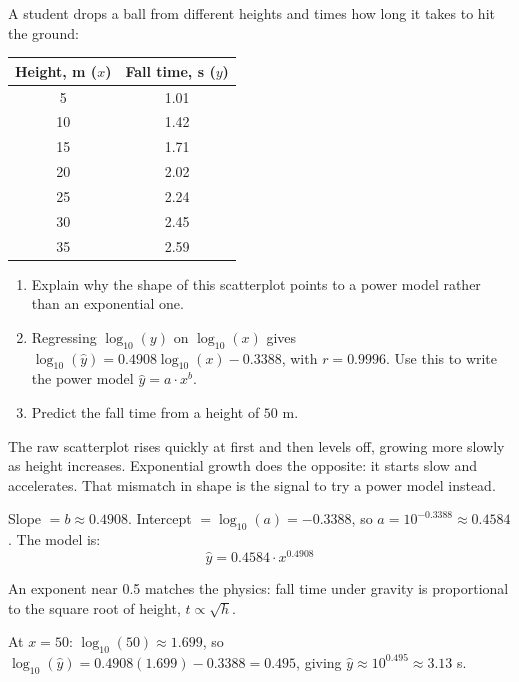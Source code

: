 \begin{Exercise}[title={Fall Time}, label=fall_time]

A student drops a ball from different heights and times how long it takes to hit the ground:

\begin{table}[H]
\begin{tabular}{c|c}
Height, m ($x$) & Fall time, s ($y$) \\
\hline
5 & 1.01 \\
10 & 1.42 \\
15 & 1.71 \\
20 & 2.02 \\
25 & 2.24 \\
30 & 2.45 \\
35 & 2.59
\end{tabular}
\end{table}

\begin{enumerate}
    \item Explain why the shape of this scatterplot points to a power model rather than an exponential one.
    \item Regressing $\log_{10}(y)$ on $\log_{10}(x)$ gives $\log_{10}(\hat{y}) = 0.4908\log_{10}(x) - 0.3388$, with $r = 0.9996$. Use this to write the power model $\hat{y} = a \cdot x^b$.
    \item Predict the fall time from a height of $50$ m.
\end{enumerate}

\end{Exercise}
\begin{Answer}[ref=fall_time]

The raw scatterplot rises quickly at first and then levels off, growing more slowly as height increases. Exponential growth does the opposite: it starts slow and accelerates. That mismatch in shape is the signal to try a power model instead.

Slope $= b \approx 0.4908$. Intercept $= \log_{10}(a) = -0.3388$, so $a = 10^{-0.3388} \approx 0.4584$. The model is:
\[
\hat{y} = 0.4584 \cdot x^{0.4908}
\]

An exponent near 0.5 matches the physics: fall time under gravity is proportional to the square root of height, $t \propto \sqrt{h}$.

At $x = 50$: $\log_{10}(50) \approx 1.699$, so $\log_{10}(\hat{y}) = 0.4908(1.699) - 0.3388 = 0.495$, giving $\hat{y} \approx 10^{0.495} \approx 3.13$ s.

\end{Answer}

